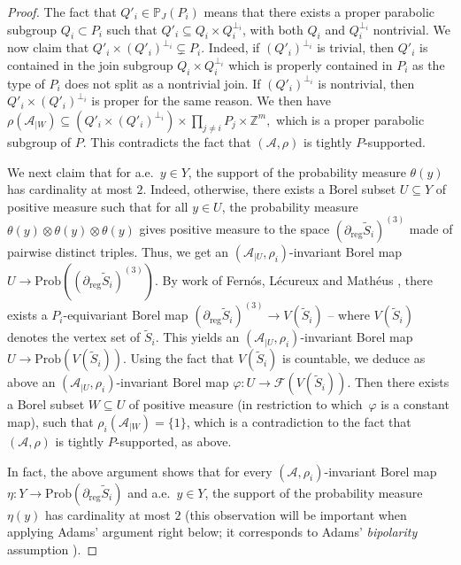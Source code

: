 \documentclass[11pt]{article}
\numberwithin{equation}{section}
\let\mathcal\mathscr
\theoremstyle{plain}
\theoremstyle{definition}
\newcommand{\cala}{\mathcal{A}}
\newcommand{\calf}{\mathcal{F}}
\newcommand{\Prob}{\mathrm{Prob}}
\newcommand{\reg}{\mathrm{reg}}
\begin{document}
\begin{proof}
The fact that $Q'_i\in\mathbb{P}_J(P_i)$ means that there exists a proper parabolic subgroup $Q_i\subset P_i$ such that $Q'_i\subseteq Q_i\times Q_i^{\perp_i}$, with both $Q_i$ and $Q_i^{\perp_i}$ nontrivial.
We now claim that $Q'_i\times (Q'_i)^{\perp_i}\subsetneq P_i$. Indeed, if $(Q'_i)^{\perp_i}$ is trivial, then $Q'_i$ is contained in the join subgroup $Q_i\times Q_i^{\perp_i}$ which is properly contained in $P_i$ as the type of $P_i$ does not split as a nontrivial join. If $(Q'_i)^{\perp_i}$ is nontrivial, then $Q'_i\times (Q'_i)^{\perp_i}$ is proper for the same reason. We then have $\rho(\cala_{|W})\subseteq (Q'_i\times (Q'_i)^{\perp_i})\times\prod_{j\neq i} P_j\times \mathbb{Z}^m,$ which is a proper parabolic subgroup of $P$. This contradicts the fact that $(\cala,\rho)$ is tightly $P$-supported.

We next claim that for a.e.\ $y\in Y$, the support of the probability measure $\theta(y)$ has cardinality at most $2$. Indeed, otherwise, there exists a Borel subset $U\subseteq Y$ of positive measure such that for all $y\in U$, the probability measure $\theta(y)\otimes\theta(y)\otimes\theta(y)$ gives positive measure to the space $(\partial_\reg \widetilde{S}_i)^{(3)}$ made of pairwise distinct triples. Thus, we get an $(\cala_{|U},\rho_i)$-invariant Borel map $U\to \Prob((\partial_\reg \widetilde{S}_i)^{(3)})$. By work of Fernós, Lécureux and Mathéus \cite[Lem.\,5.14 \&~6.21]{FLM}, there exists a $P_i$-equivariant Borel map $(\partial_\reg \widetilde{S}_i)^{(3)}\to V(\widetilde{S}_i)$ -- where $V(\widetilde{S}_i)$ denotes the vertex set of $\widetilde{S}_i$.
This yields an $(\cala_{|U},\rho_i)$-invariant Borel map $U\to \Prob(V(\widetilde{S}_i))$. Using the fact that $V(\widetilde{S}_i)$ is countable, we deduce as above an $(\cala_{|U},\rho_i)$-invariant Borel map $\varphi:U\to\calf(V(\widetilde{S}_i))$. Then there exists a Borel subset $W\subseteq U$ of positive measure (in restriction to which~$\varphi$ is a constant map), such that $\rho_i(\cala_{|W})=\{1\}$, which is a contradiction to the fact that $(\cala,\rho)$ is tightly $P$-supported, as above.

In fact, the above argument shows that for every $(\cala,\rho_i)$-invariant Borel map $\eta:Y\to\Prob(\partial_\reg \widetilde{S}_i)$ and a.e.\ $y\in Y$, the support of the probability measure $\eta(y)$ has cardinality at most $2$ (this observation will be important when applying Adams' argument right below; it corresponds to Adams' \emph{bipolarity} assumption \cite[Def.\,3.1]{Ada}).\enlargethispage{\baselineskip}%


\end{proof}
\end{document}
